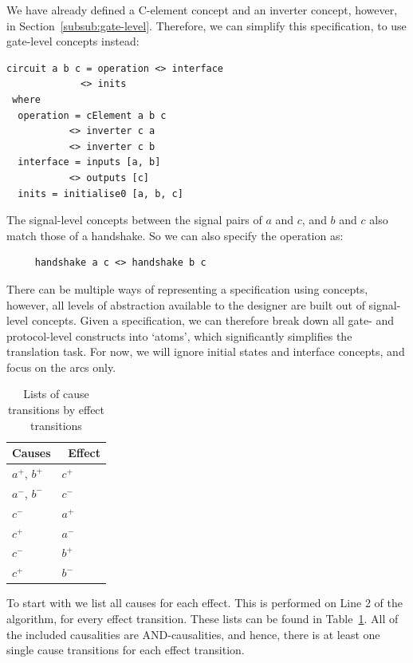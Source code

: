 \documentclass[british,conference,compsoc]{IEEEtran}
\begin{document}
We have already defined a C-element concept and an inverter concept, however,
 in Section~\ref{subsub:gate-level}. Therefore, we can simplify this specification, 
 to use gate-level concepts instead:

\begin{verbatim}
circuit a b c = operation <> interface 
             <> inits
 where
  operation = cElement a b c 
           <> inverter c a 
           <> inverter c b
  interface = inputs [a, b] 
           <> outputs [c]
  inits = initialise0 [a, b, c]
\end{verbatim}

The signal-level concepts between the signal pairs of $a$ and $c$, and $b$ and $c$
also match those of a handshake. So we can also specify the operation as:

\begin{verbatim}
     handshake a c <> handshake b c
\end{verbatim}

\noindent There can be multiple ways of representing a specification using concepts, 
however, all levels of abstraction available to the designer are built out of signal-level
concepts. Given a specification, we can therefore break down 
all gate- and protocol-level constructs into `atoms', which significantly 
simplifies the translation task. For now, we will ignore initial states and interface
concepts, and focus on the arcs only.

\begin{table}[h]
\vspace{-2mm}
\caption{Lists of cause transitions by effect transitions
		\label{tab:list-of-concepts}}
  \centering
\begin{tabular}[htb]{| m{2.7cm} | m{2.0cm} |}
  \hline
Causes & \, Effect \\ \hline \hline
$a^{+}$, $b^{+}$		& $c^{+}$ 	\\ \hline
$a^{-}$, $b^{-}$ 		& $c^{-}$ 	\\ \hline
$c^{-}$			& $a^{+}$ 	\\ \hline
$c^{+}$			& $a^{-}$ 	\\ \hline
$c^{-}$			& $b^{+}$ 	\\ \hline
$c^{+}$			& $b^{-}$ 	\\ \hline
  \end{tabular}
  \vspace{-3mm}
\end{table}

To start with we list all causes for each effect. This is performed on Line 2 of the algorithm, for every effect transition. 
These lists can be found in Table~\ref{tab:list-of-concepts}.
All of the included causalities are AND-causalities, and hence, there
is at least one single cause transitions for each effect transition. 
\end{document}
